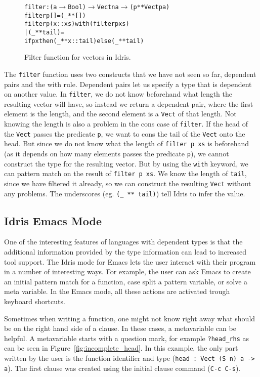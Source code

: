 \begin{figure}
\begin{alltt}
filter : (a \(\to\) Bool) \(\to\) Vect n a \(\to\) (p ** Vect p a)
filter p [] = (_ ** [])
filter p (x::xs) with (filter p xs)
  | (_ ** tail) =
    if p x then (_ ** x::tail) else (_ ** tail)
\end{alltt}
\caption{Filter function for vectors in Idris.}
\label{fig:filter}
\end{figure}

The \texttt{filter} function uses two constructs that we have not seen so far, dependent pairs and the with rule. Dependent pairs let us specify a type that is dependent on another value. In \texttt{filter}, we do not know beforehand what length the resulting vector will have, so instead we return a dependent pair, where the first element is the length, and the second element is a \texttt{Vect} of that length. Not knowing the length is also a problem in the cons case of \texttt{filter}. If the head of the \texttt{Vect} passes the predicate \texttt{p}, we want to cons the tail of the \texttt{Vect} onto the head. But since we do not know what the length of \texttt{filter p xs} is beforehand (as it depends on how many elements passes the predicate \texttt{p}), we cannot construct the type for the resulting vector. But by using the \texttt{with} keyword, we can pattern match on the result of \texttt{filter p xs}. We know the length of \texttt{tail}, since we have filtered it already, so we can construct the resulting \texttt{Vect} without any problems. The underscores (eg. \texttt{(\_ ** tail)}) tell Idris to infer the value.


\subsection{Idris Emacs Mode}
One of the interesting features of languages with dependent types is that the additional information provided by the type information can lead to increased tool support.
The Idris mode for Emacs lets the user interact with their program in a number of interesting ways.
For example, the user can ask Emacs to create an initial pattern match for a function, case split a pattern variable, or solve a meta variable.
In the Emacs mode, all these actions are activated trough keyboard shortcuts.

Sometimes when writing a function, one might not know right away what should be on the right hand side of a clause.
In these cases, a metavariable can be helpful. A metavariable starts with a question mark, for example \texttt{?head\_rhs} as can be seen in Figure~\ref{fig:incomplete_head}.
In this example, the only part written by the user is the function identifier and type (\texttt{head : Vect (S n) a -> a}).
The first clause was created using the initial clause command (\texttt{C-c C-s}).

